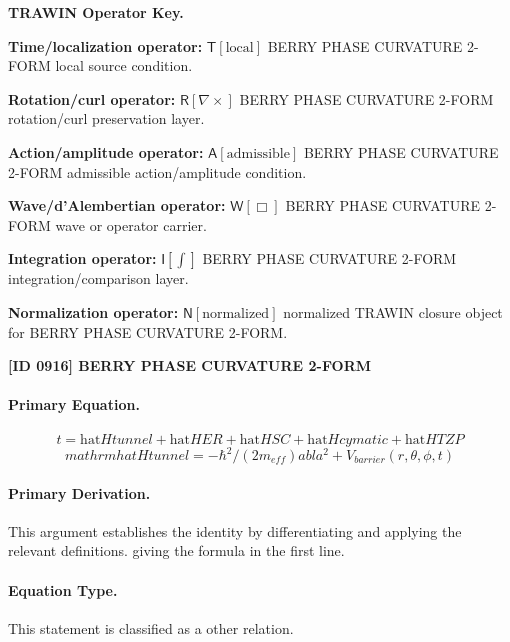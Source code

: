 \par\vspace{0.45\baselineskip}
\noindent\begin{minipage}[t]{\linewidth}
\begingroup
\small
\raggedright
\textbf{TRAWIN Operator Key.}\par
\noindent\textbf{Time/localization operator:} $\mathsf{T}\!\left[\mathrm{local}\right]$ BERRY PHASE CURVATURE 2-FORM local source condition.\par
\noindent\textbf{Rotation/curl operator:} $\mathsf{R}\!\left[\nabla\times\right]$ BERRY PHASE CURVATURE 2-FORM rotation/curl preservation layer.\par
\noindent\textbf{Action/amplitude operator:} $\mathsf{A}\!\left[\mathrm{admissible}\right]$ BERRY PHASE CURVATURE 2-FORM admissible action/amplitude condition.\par
\noindent\textbf{Wave/d'Alembertian operator:} $\mathsf{W}\!\left[\Box\right]$ BERRY PHASE CURVATURE 2-FORM wave or operator carrier.\par
\noindent\textbf{Integration operator:} $\mathsf{I}\!\left[\int\right]$ BERRY PHASE CURVATURE 2-FORM integration/comparison layer.\par
\noindent\textbf{Normalization operator:} $\mathsf{N}\!\left[\mathrm{normalized}\right]$ normalized TRAWIN closure object for BERRY PHASE CURVATURE 2-FORM.\par
\endgroup
\end{minipage}

\clearpage
\noindent\textbf{[ID 0916] BERRY PHASE CURVATURE 2-FORM}\par
\vspace{0.35em}
\paragraph{Primary Equation.}
\[
t = \mathrm{hat}{H}tunnel + \mathrm{hat}{H}ER + \mathrm{hat}{H}SC + \mathrm{hat}{H}cymatic + \mathrm{hat}{H}TZP
\]
\[
mathrm{hat}{H}tunnel = -\hbar^2/(2 m_{eff})  abla^2 + V_{barrier}(r, \theta, \phi, t)
\]

\paragraph{Primary Derivation.}
This argument establishes the identity by differentiating and applying the relevant definitions. giving the formula in the first line.
\paragraph{Equation Type.}
This statement is classified as a other relation.

